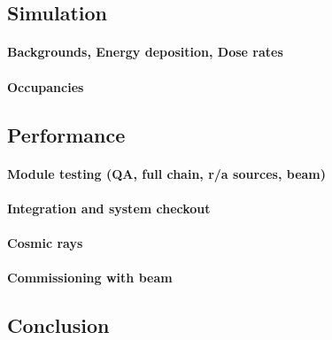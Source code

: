 \subsection{Simulation}
\paragraph{Backgrounds, Energy deposition, Dose rates}
\paragraph{Occupancies}
\subsection{Performance}
\paragraph{Module testing (QA, full chain, r/a sources, beam)}
\paragraph{Integration and system checkout}
\paragraph{Cosmic rays}
\paragraph{Commissioning with beam}
\subsection{Conclusion}

